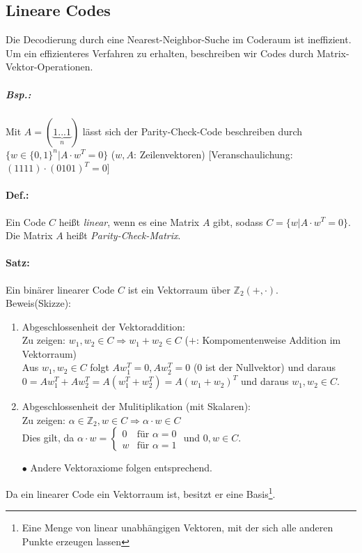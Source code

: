 \subsection{Lineare Codes}
Die Decodierung durch eine Nearest-Neighbor-Suche im Coderaum ist ineffizient. Um ein effizienteres Verfahren zu erhalten, beschreiben wir Codes durch Matrix-Vektor-Operationen.
\subparagraph{Bsp.:} Mit $A = (\underbrace{1 ... 1}_{n})$ lässt sich der Parity-Check-Code beschreiben durch $\{w\in \{0,1\}^n| A\cdot w^T=0\}$ ($w,A$: Zeilenvektoren) [Veranschaulichung: $(1111)\cdot(0101)^T=0$]

\paragraph{Def.:} Ein Code $C$ heißt \emph{linear}, wenn es eine Matrix $A$ gibt, sodass $C=\{w|A\cdot w^T=0\}$.\\
Die Matrix $A$ heißt \emph{Parity-Check-Matrix}.

\paragraph{Satz:} Ein binärer linearer Code $C$ ist ein Vektorraum über $\mathbb{Z}_2(+,\cdot)$.\\
Beweis(Skizze):
\begin{enumerate}
\item Abgeschlossenheit der Vektoraddition:\\
Zu zeigen: $w_1,w_2\in C \Rightarrow w_1+w_2 \in C$ ($+$: Kompomentenweise Addition im Vektorraum)\\
Aus $w_1,w_2\in C$ folgt $Aw_1^T=0, Aw_2^T=0$ ($0$ ist der Nullvektor) und daraus $0=Aw_1^T+Aw_2^T=A(w_1^T+w_2^T)=A(w_1+w_2)^T$ und daraus $w_1,w_2 \in C$.
\item Abgeschlossenheit der Mulitiplikation (mit Skalaren):\\
Zu zeigen: $\alpha \in \mathbb{Z}_2, w \in C \Rightarrow \alpha \cdot w \in C$\\
Dies gilt, da $\alpha\cdot w =\begin{cases}
0 & \text{für }\alpha =0\\
w & \text{für } \alpha =1
\end{cases}$ und $0,w \in C$.
\item[$\bullet$] Andere Vektoraxiome folgen entsprechend.
\end{enumerate}
Da ein linearer Code ein Vektorraum ist, besitzt er eine Basis\footnote{Eine Menge von linear unabhängigen Vektoren, mit der sich alle anderen Punkte erzeugen lassen}.

